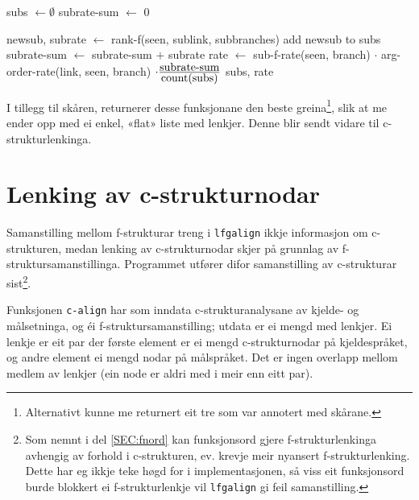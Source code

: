 \documentclass[12pt,a4paper,oneside,draft]{report}
\begin{document}
      \begin{algorithm}[htbp]
      subs $\gets \emptyset$ \;
      subrate-sum $\gets$ 0 \;
      \caption{rank-branch(seen, link, branch)}
      \label{algo:rank-branch}
         {
          newsub, subrate $\gets$ rank-f(seen, sublink, subbranches) \;
          add newsub to subs \;
          subrate-sum $\gets$ subrate-sum $+$ subrate \;
        }
        rate $\gets$ sub-f-rate(seen, branch) $\cdot$ arg-order-rate(link, seen, branch) $\cdot \frac{\text{\normalsize subrate-sum}}{\text{\normalsize count(subs)}}$ \;
        \Return subs, rate \;
      \end{algorithm}

I tillegg til skåren, returnerer desse funksjonane den beste
greina\footnote{Alternativt kunne me returnert eit tre som var annotert med
        skårane. }, slik at me ender opp med ei enkel, «flat» liste med
lenkjer. Denne blir sendt vidare til c\hyp{}strukturlenkinga.


\section{Lenking av c\hyp{}strukturnodar}
\label{sec-4.3}

Samanstilling mellom f\hyp{}strukturar treng i \texttt{lfgalign} ikkje informasjon
om c\hyp{}strukturen, medan lenking av c\hyp{}strukturnodar skjer på grunnlag
av f\hyp{}struktursamanstillinga. Programmet utfører difor samanstilling av
c\hyp{}strukturar sist\footnote{Som nemnt i del \ref{SEC:fnord} kan funksjonsord gjere
       f\hyp{}strukturlenkinga avhengig av forhold i c\hyp{}strukturen,
       ev. krevje meir nyansert f\hyp{}strukturlenking. Dette har eg
       ikkje teke høgd for i implementasjonen, så viss eit funksjonsord
       burde blokkert ei f\hyp{}strukturlenkje vil \texttt{lfgalign} gi feil
       samanstilling. }.

Funksjonen \texttt{c-align} har som inndata c\hyp{}strukturanalysane av kjelde- og
målsetninga, og éi f\hyp{}struktursamanstilling; utdata er ei mengd med
lenkjer. Ei lenkje er eit par der første element er ei mengd
c\hyp{}strukturnodar på kjeldespråket, og andre element ei mengd nodar på
målspråket. Det er ingen overlapp mellom medlem av lenkjer (ein node
er aldri med i meir enn eitt par).
\end{document}

